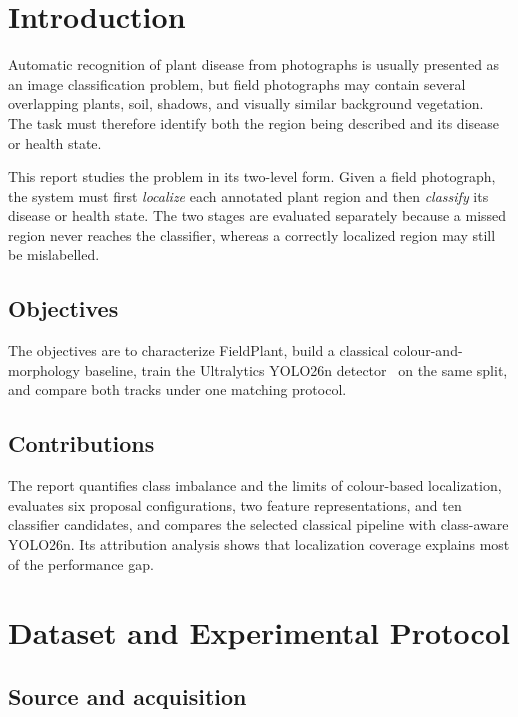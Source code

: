 \documentclass[a4paper,8pt]{article}
\begin{document}
\clearpage
\tableofcontents
\clearpage

\section{Introduction}

Automatic recognition of plant disease from photographs is usually presented as an image
classification problem, but field photographs may contain several overlapping plants, soil,
shadows, and visually similar background vegetation. The task must therefore identify both the
region being described and its disease or health state.

This report studies the problem in its two-level form. Given a field photograph, the system
must first \emph{localize} each annotated plant region and then \emph{classify} its disease or
health state. The two stages are evaluated separately because a missed region never reaches the
classifier, whereas a correctly localized region may still be mislabelled.

\subsection{Objectives}

The objectives are to characterize FieldPlant, build a classical colour-and-morphology baseline,
train the Ultralytics YOLO26n detector~\cite{yolo26} on the same split, and compare both tracks
under one matching protocol.

\subsection{Contributions}

The report quantifies class imbalance and the limits of colour-based localization, evaluates six
proposal configurations, two feature representations, and ten classifier candidates, and
compares the selected classical pipeline with class-aware YOLO26n. Its attribution analysis
shows that localization coverage explains most of the performance gap.

\section{Dataset and Experimental Protocol}
\label{sec:dataset}

\subsection{Source and acquisition}
\end{document}
